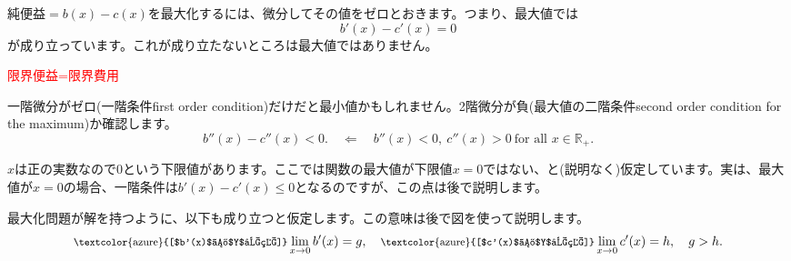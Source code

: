 \begin{frame}{}
純便益$=b(x)-c(x)$を最大化するには、微分してその値をゼロとおきます。つまり、最大値では
\[
b'(x)-c'(x)=0
\]
が成り立っています。これが成り立たないところは最大値ではありません。
	\begin{dinglist}{43}
	\vspace{1.0ex}\setlength{\itemsep}{1.0ex}\setlength{\baselineskip}{12pt}
\pause
	\item	\textcolor{red}{限界便益=限界費用}
\end{dinglist}
\pause
\vspace{2ex}
一階微分がゼロ(一階条件first order condition)だけだと最小値かもしれません。2階微分が負(最大値の二階条件second order condition for the maximum)か確認します。
\[
b''(x)-c''(x)<0. \quad \Leftarrow \quad b''(x)<0, \ c''(x)>0 \ \mbox{for all }x\in\mathbb R_{+}.
\]
\begin{dinglist}{45}
\vspace{1.0ex}\setlength{\itemsep}{1.0ex}\setlength{\baselineskip}{12pt}
\pause
	\item	$x$は正の実数なので0という下限値があります。ここでは関数の最大値が下限値$x=0$ではない、と(説明なく)仮定しています。実は、最大値が$x=0$の場合、一階条件は$b'(x)-c'(x)\leqslant 0$となるのですが、この点は後で説明します。
\pause
	\item	最大化問題が解を持つように、以下も成り立つと仮定します。この意味は後で図を使って説明します。
	\[
	\mbox{\footnotesize \textcolor{azure}{[$b'(x)$の$Y$切片]}} \lim_{x\rightarrow 0}b'(x)=g, \quad \mbox{\footnotesize \textcolor{azure}{[$c'(x)$の$Y$切片]}} \lim_{x\rightarrow 0}c'(x)=h, \quad g>h.
	\]
	\end{dinglist}
\end{frame}

